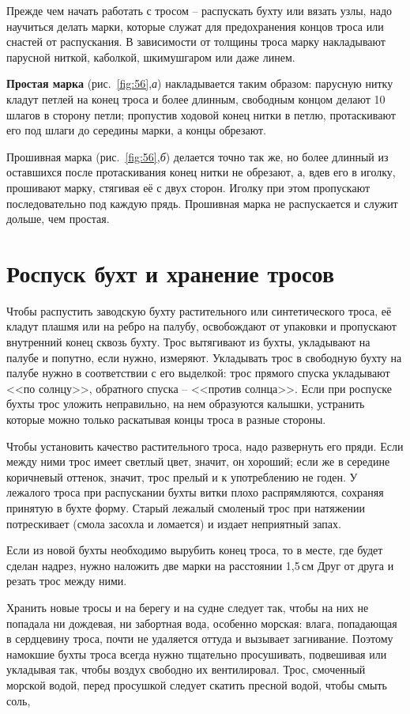 \documentclass[a4paper, 12pt, twoside, final]{scrbook}
\begin{document}
Прежде чем начать работать с тросом \--- распускать бухту или вязать узлы, надо научиться делать марки, которые служат для предохранения концов троса или снастей от распускания. В зависимости от толщины троса марку накладывают парусной ниткой, каболкой, шкимушгаром или даже линем.

\textbf{Простая марка} (рис.~\ref{fig:56},\textit{а}) накладывается таким образом: парусную нитку кладут петлей на конец троса и более длинным, свободным концом делают 10 шлагов в сторону петли; пропустив ходовой конец нитки в петлю, протаскивают его под шлаги до середины марки, а концы обрезают.

Прошивная марка (рис.~\ref{fig:56},\textit{б}) делается точно так же, но более длинный из оставшихся после протаскивания конец нитки не обрезают, а, вдев его в иголку, прошивают марку, стягивая её с двух сторон. Иголку при этом пропускают последовательно под каждую прядь. Прошивная марка не распускается и служит дольше, чем простая.

\section{Роспуск бухт и хранение тросов}

Чтобы распустить заводскую бухту растительного или синтетического троса, её кладут плашмя или на ребро на палубу, освобождают от упаковки и пропускают внутренний конец сквозь бухту. Трос вытягивают из бухты, укладывают на палубе и попутно, если нужно, измеряют. Укладывать трос в свободную бухту на палубе нужно в соответствии с его выделкой: трос прямого спуска укладывают <<по солнцу>>, обратного спуска \--- <<против солнца>>. Если при роспуске бухты трос уложить неправильно, на нем образуются калышки, устранить которые можно только раскатывая концы троса в разные стороны.

Чтобы установить качество растительного троса, надо развернуть его пряди. Если между ними трос имеет светлый цвет, значит, он хороший; если же в середине коричневый оттенок, значит, трос прелый и к употреблению не годен. У лежалого троса при распускании бухты витки плохо распрямляются, сохраняя принятую в бухте форму. Старый лежалый смоленый трос при натяжении потрескивает (смола засохла и ломается) и издает неприятный запах.

Если из новой бухты необходимо вырубить конец троса, то в месте, где будет сделан надрез, нужно наложить две марки на расстоянии 1,5\,см Друг от друга и резать трос между ними.

Хранить новые тросы и на берегу и на судне следует так, чтобы на них не попадала ни дождевая, ни забортная вода, особенно морская: влага, попадающая в сердцевину троса, почти не удаляется оттуда и вызывает загнивание. Поэтому намокшие бухты троса всегда нужно тщательно просушивать, подвешивая или укладывая так, чтобы воздух свободно их вентилировал. Трос, смоченный морской водой, перед просушкой следует скатить пресной водой, чтобы смыть соль,
\end{document}
